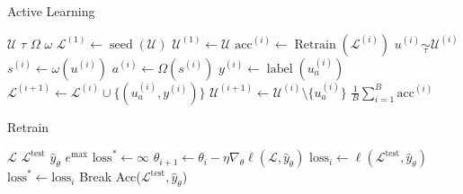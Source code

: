 \documentclass[]{article}
\begin{document}
\begin{minipage}{0.59\linewidth}
	\begin{algorithm}[H]
		\caption{Active Learning}\label{alg:active_learning}
		\begin{algorithmic}[1]
			\Require $\mathcal{U}$ 
			\Require $\tau$ 
			\Require $\Omega$ 
			\Require $\omega$ 
			\State $\mathcal{L}^{(1)} \gets \operatorname{seed}(\mathcal{U})$  
			\State $\mathcal{U}^{(1)} \gets \mathcal{U}$
				\State $\text{acc}^{(i)} \gets \operatorname{Retrain}(\mathcal{L}^{(i)})$  
				\State $u^{(i)} \underset{\tau}{\sim} \mathcal{U}^{(i)}$
				\State $s^{(i)} \gets \omega(u^{(i)})$
				\State $a^{(i)} \gets \Omega(s^{(i)})$ 
				\State $y^{(i)} \gets \operatorname{label}(u^{(i)}_{a})$ 
				\State $\mathcal{L}^{(i+1)} \gets \mathcal{L}^{(i)} \cup \{(u^{(i)}_a, y^{(i)})\}$
				\State $\mathcal{U}^{(i+1)} \gets \mathcal{U}^{(i)} \setminus \{u^{(i)}_a\}$
			\EndFor
			\State
			\Return $\frac{1}{B} \sum_{i=1}^{B} \text{acc}^{(i)}$
		\end{algorithmic}
	\end{algorithm}
\end{minipage}
\hspace{3mm}
\begin{minipage}{0.35\linewidth}
	\begin{algorithm}[H]
		\caption{Retrain}\label{alg:retrain}
		\begin{algorithmic}[1]
			\Require $\mathcal{L}$ 
			\Require $\mathcal{L}^\text{test}$ 
			\Require $\hat y_\theta$ 
			\Require $e^\text{max}$ 
			\State $\text{loss}^* \gets \infty$
			\State $\theta_{i+1} \gets \theta_i - \eta \nabla_\theta \ell(\mathcal{L}, \hat y_{\theta})$
			\State $\text{loss}_i \gets \ell(\mathcal{L}^\text{test}, \hat y_{\theta})$
			\State $\text{loss}^* \gets \text{loss}_i$
			\Else
			\State Break
			\EndIf
			\EndFor
			\State
			\Return Acc($\mathcal{L}^\text{test}, \hat y_{\theta}$)
		\end{algorithmic}
	\end{algorithm}
\end{minipage}
\end{document}
